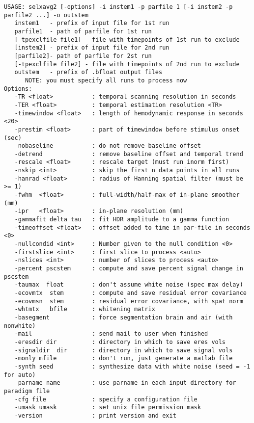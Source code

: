 \documentclass[10pt]{article}
\begin{document}
\begin{small}
\begin{verbatim}
USAGE: selxavg2 [-options] -i instem1 -p parfile 1 [-i instem2 -p parfile2 ...] -o outstem
   instem1   - prefix of input file for 1st run
   parfile1  - path of parfile for 1st run
   [-tpexclfile file1] - file with timepoints of 1st run to exclude
   [instem2] - prefix of input file for 2nd run
   [parfile2]- path of parfile for 2st run
   [-tpexclfile file2] - file with timepoints of 2nd run to exclude
   outstem   - prefix of .bfloat output files
      NOTE: you must specify all runs to process now
Options:
   -TR <float>           : temporal scanning resolution in seconds 
   -TER <float>          : temporal estimation resolution <TR>
   -timewindow <float>   : length of hemodynamic response in seconds <20>
   -prestim <float>      : part of timewindow before stimulus onset (sec)
   -nobaseline           : do not remove baseline offset 
   -detrend              : remove baseline offset and temporal trend
   -rescale <float>      : rescale target (must run inorm first)
   -nskip <int>          : skip the first n data points in all runs
   -hanrad <float>       : radius of Hanning spatial filter (must be >= 1)
   -fwhm  <float>        : full-width/half-max of in-plane smoother (mm)
   -ipr   <float>        : in-plane resolution (mm)
   -gammafit delta tau   : fit HDR amplitude to a gamma function 
   -timeoffset <float>   : offset added to time in par-file in seconds <0>
   -nullcondid <int>     : Number given to the null condition <0>
   -firstslice <int>     : first slice to process <auto>
   -nslices <int>        : number of slices to process <auto>
   -percent pscstem      : compute and save percent signal change in pscstem
   -taumax  float        : don't assume white noise (spec max delay)
   -ecovmtx  stem        : compute and save residual error covariance
   -ecovmsn  stem        : residual error covariance, with spat norm
   -whtmtx   bfile       : whitening matrix
   -basegment            : force segmentation brain and air (with nonwhite)
   -mail                 : send mail to user when finished
   -eresdir dir          : directory in which to save eres vols
   -signaldir  dir       : directory in which to save signal vols
   -monly mfile          : don't run, just generate a matlab file
   -synth seed           : synthesize data with white noise (seed = -1 for auto)
   -parname name         : use parname in each input directory for paradigm file
   -cfg file             : specify a configuration file
   -umask umask          : set unix file permission mask
   -version              : print version and exit
\end{verbatim}
\end{small}
\end{document}
